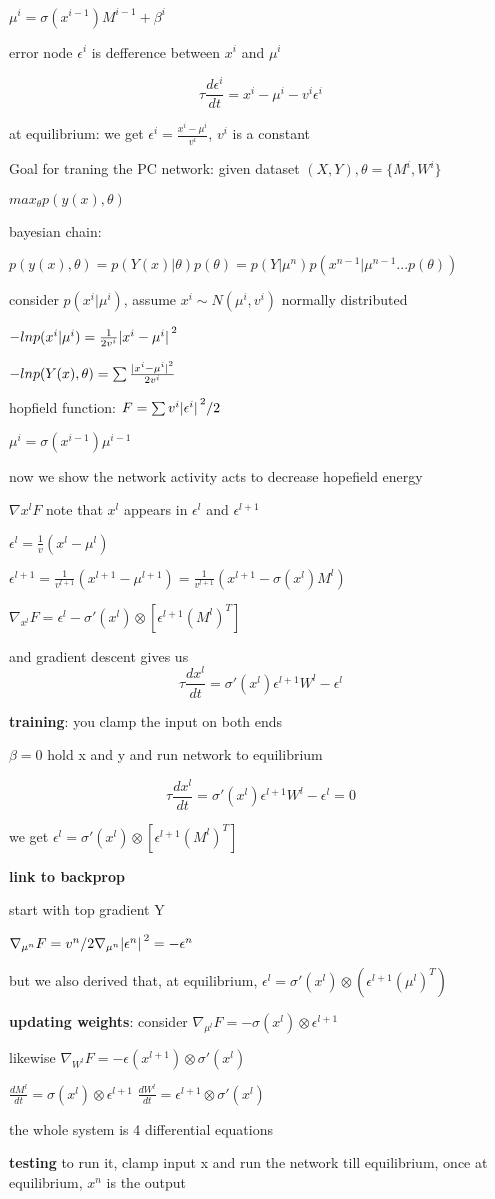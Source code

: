 \documentclass[10pt]{article}
\theoremstyle{break}
\begin{document}
$\mu^i=\sigma (x^{i-1}) M ^{i-1} +\beta^i$

error node $\epsilon^i$ is defference between $x^i$ and $\mu^i$

$$\tau \frac{d\epsilon^i}{dt} = x^i - \mu^i -v^i\epsilon^i$$

at equilibrium: we get
$\epsilon^i = \frac{x^i - \mu^i}{v^i}$, $v^i$ is a constant

Goal for traning the PC network: 
given dataset $(X,Y), \theta = \{M^i,W^i\}$

$max_\theta p(y(x),\theta)$

bayesian chain:

$p(y(x),\theta) = p(Y(x)|\theta)p(\theta)=p(Y|\mu^n)p(x^{n-1}|\mu^{n-1}...p(\theta))$

consider $p(x^i|\mu^i)$, assume $x^i\sim N(\mu^i, v^i)$ normally distributed 

$-lnp(x^i|\mu^i) = \frac{1}{2v^i}\abs*{x^i-\mu^i}^2$

$-ln p(Y(x), \theta)=\sum\frac{\abs*{x^i-\mu^i}^2}{2v^i}$


hopfield function:
$F=\sum v^i\abs*{\epsilon^i}^2/2$

$\mu^i = \sigma( x ^{i-1})\mu ^{i-1}$

now we show the network activity acts to decrease hopefield energy

$\nabla{x^l}F$ note that $x^l$ appears in $\epsilon^l$ and $\epsilon^{l+1}$

$\epsilon^l = \frac{1}{v}(x^l-\mu^l)$

$\epsilon^{l+1} = \frac{1}{v^{l+1}}(x^{l+1}-\mu^{l+1})=\frac{1}{v^{l+1}}(x^{l+1}-\sigma(x^l)M^l)$

$\nabla_{x^l}F = \epsilon^l -\sigma'(x^l)\otimes [\epsilon^{l+1}(M^l)^T]$

and gradient descent gives us 
$$\tau \frac{dx^l}{dt}=\sigma ' (x^l)\epsilon^{l+1}W^l -\epsilon^l$$

\textbf{training}: you clamp the input on both ends

$\beta=0$ hold x and y and run network to equilibrium 

$$\tau\frac{dx^l}{dt}=\sigma '(x^l)\epsilon^{l+1}W^l-\epsilon^l=0$$

we get $\epsilon^l=\sigma ' (x^l)\otimes [\epsilon ^{l+1}(M^l)^T]$

\textbf{link to backprop}

start with top gradient Y 

$\nabla_{\mu^n}F=v^n/2\nabla_{\mu^n}\abs*{\epsilon^n}^2=-\epsilon^n$

but we also derived that, at equilibrium,
$\epsilon^l = \sigma ' (x^l)\otimes (\epsilon^{l+1}(\mu^l)^T)$

\textbf{updating weights}: consider $\nabla_{\mu^l}F=-\sigma(x^l)\otimes\epsilon^{l+1}$

likewise
$\nabla_{W^l}F=-\epsilon(x^{l+1})\otimes\sigma'(x^l)$

$\frac{dM^l}{dt}=\sigma(x^l)\otimes\epsilon^{l+1}$
$\frac{dW^l}{dt}=\epsilon^{l+1}\otimes\sigma'(x^l) $


the whole system is 4 differential equations

\textbf{testing}
to run it, clamp input x and run the network till equilibrium, 
once at equilibrium, $x^n$ is the output
\end{document}
